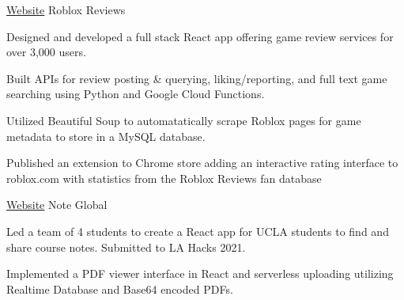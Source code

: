 

\begin{cventries}

\cventry
    {\href{https://www.roblox.reviews}{Website}} %
    {Roblox Reviews} %
    {} %
    {} %
    {
      \begin{cvitems} %
        \item {Designed and developed a full stack React app offering game
        review services for over 3,000 users.}
        \item {Built APIs for review posting \& querying, liking/reporting,
        and full text game searching using Python and Google Cloud Functions.}
        \item {Utilized Beautiful Soup to automatatically scrape Roblox pages
        for game metadata to store in a MySQL database.}
        \item {Published an extension to Chrome store adding an interactive
        rating interface to roblox.com with statistics from the Roblox Reviews
        fan database}
      \end{cvitems}
    }

\cventry
    {\href{https://note-global.firebaseapp.com/}{Website}} %
    {Note Global} %
    {} %
    {} %
    {
      \begin{cvitems} %
        \item {Led a team of 4 students to create a React app for UCLA students
        to find and share course notes. Submitted to LA Hacks 2021.}
        \item {Implemented a PDF viewer interface in React and serverless
        uploading utilizing Realtime Database and Base64 encoded PDFs.}
      \end{cvitems}
    }


    
\end{cventries}
